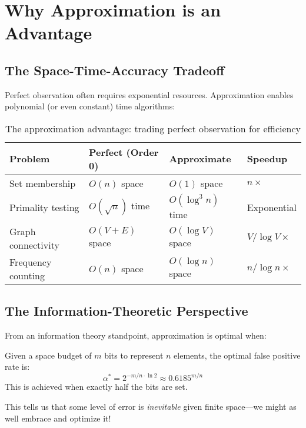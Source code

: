\section{Why Approximation is an Advantage}

\subsection{The Space-Time-Accuracy Tradeoff}

Perfect observation often requires exponential resources. Approximation enables polynomial (or even constant) time algorithms:

\begin{table}[h]
\centering
\begin{tabular}{|l|l|l|l|}
\hline
\textbf{Problem} & \textbf{Perfect (Order 0)} & \textbf{Approximate} & \textbf{Speedup} \\
\hline
Set membership & $O(n)$ space & $O(1)$ space & $n\times$ \\
Primality testing & $O(\sqrt{n})$ time & $O(\log^3 n)$ time & Exponential \\
Graph connectivity & $O(V + E)$ space & $O(\log V)$ space & $V/\log V\times$ \\
Frequency counting & $O(n)$ space & $O(\log n)$ space & $n/\log n\times$ \\
\hline
\end{tabular}
\caption{The approximation advantage: trading perfect observation for efficiency}
\end{table}

\subsection{The Information-Theoretic Perspective}

From an information theory standpoint, approximation is optimal when:

\begin{theorem}
Given a space budget of $m$ bits to represent $n$ elements, the optimal false positive rate is:
\begin{equation}
\alpha^* = 2^{-m/n \cdot \ln 2} \approx 0.6185^{m/n}
\end{equation}
This is achieved when exactly half the bits are set.
\end{theorem}

This tells us that some level of error is \textit{inevitable} given finite space—we might as well embrace and optimize it!

